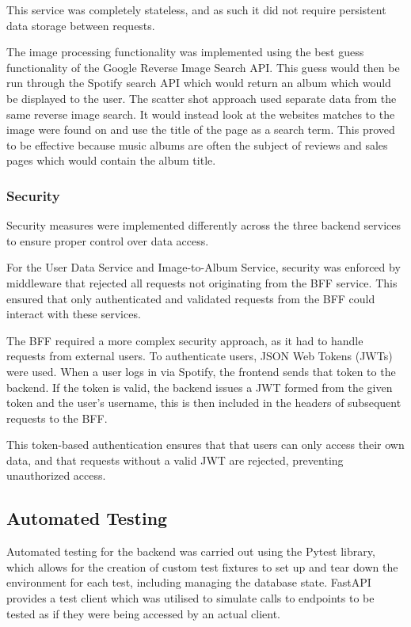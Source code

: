 This service was completely stateless, and as such it did not require persistent data storage between requests.

The image processing functionality was implemented using the best guess functionality of the Google Reverse Image Search API. This guess would then be run through the Spotify search API which would return an album which would be displayed to the user. The scatter shot approach used separate data from the same reverse image search. It would instead look at the websites matches to the image were found on and use the title of the page as a search term. This proved to be effective because music albums are often the subject of reviews and sales pages which would contain the album title.

\subsubsection{Security}
Security measures were implemented differently across the three backend services to ensure proper control over data access.

For the User Data Service and Image-to-Album Service, security was enforced by middleware that rejected all requests not originating from the BFF service. This ensured that only authenticated and validated requests from the BFF could interact with these services.

The BFF required a more complex security approach, as it had to handle requests from external users. To authenticate users, JSON Web Tokens (JWTs) were used. When a user logs in via Spotify, the frontend sends that token to the backend. If the token is valid, the backend issues a JWT formed from the given token and the user's username, this is then included in the headers of subsequent requests to the BFF.

This token-based authentication ensures that that users can only access their own data, and that requests without a valid JWT are rejected, preventing unauthorized access.

\subsection{Automated Testing}
Automated testing for the backend was carried out using the Pytest library, which allows for the creation of custom test fixtures to set up and tear down the environment for each test, including managing the database state. FastAPI provides a test client which was utilised to simulate calls to endpoints to be tested as if they were being accessed by an actual client.

